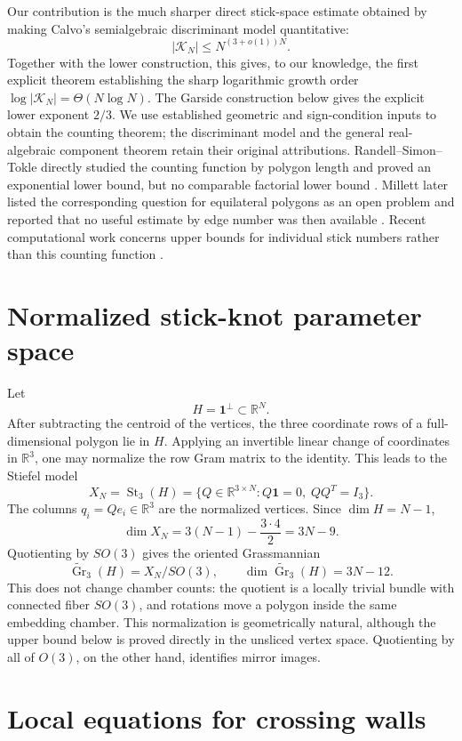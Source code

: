 \documentclass[11pt]{article}
\theoremstyle{remark}
\theoremstyle{plain}
\newcommand{\R}{\mathbb{R}}
\newcommand{\Kcal}{\mathcal{K}}
\DeclareMathOperator{\Gr}{Gr}
\DeclareMathOperator{\St}{St}
\begin{document}
Our contribution is the much sharper direct stick-space estimate obtained by
making Calvo's semialgebraic discriminant model quantitative:
\[
 |\Kcal_N|\le N^{(3+o(1))N}.
\]
Together with the lower construction, this gives, to our knowledge, the first
explicit theorem establishing the sharp logarithmic growth order
\(\log|\Kcal_N|=\Theta(N\log N)\).  The Garside construction below gives
the explicit lower exponent \(2/3\).  We use established geometric and
sign-condition inputs to obtain the counting theorem; the discriminant model
and the general real-algebraic component theorem retain their original
attributions.
Randell--Simon--Tokle directly studied the counting
function by polygon length and proved an exponential lower bound, but no
comparable factorial lower bound \cite{RandellSimonTokle}.  Millett later
listed the corresponding question for equilateral polygons as an open problem
and reported that no useful estimate by edge number was then available
\cite[Problem 5.2]{MillettPhysical}.  Recent computational work concerns upper
bounds for individual stick numbers rather than this counting function
\cite{CantarellaEtAl2025}.
\section{Normalized stick-knot parameter space}

Let
\[
    H=\mathbf{1}^{\perp}\subset\R^N.
\]
After subtracting the centroid of the vertices, the three coordinate rows of a
full-dimensional polygon lie in \(H\).  Applying an invertible linear change of
coordinates in \(\R^3\), one may normalize the row Gram matrix to the identity.
This leads to the Stiefel model
\[
    X_N=\St_3(H)
    =
    \{Q\in\R^{3\times N}: Q\mathbf{1}=0,\; QQ^T=I_3\}.
\]
The columns \(q_i=Qe_i\in\R^3\) are the normalized vertices.  Since
\(\dim H=N-1\),
\[
    \dim X_N
    =
    3(N-1)-\frac{3\cdot4}{2}
    =
    3N-9.
\]
Quotienting by \(SO(3)\) gives the oriented Grassmannian
\[
    \widetilde{\Gr}_3(H)=X_N/SO(3),
    \qquad
    \dim \widetilde{\Gr}_3(H)=3N-12.
\]
This does not change chamber counts: the quotient is a locally trivial bundle
with connected fiber \(SO(3)\), and rotations move a polygon inside the same
embedding chamber.  This normalization is geometrically natural, although the
upper bound below is proved directly in the unsliced vertex space.
Quotienting by all of \(O(3)\), on the other hand, identifies mirror images.

\section{Local equations for crossing walls}
\end{document}
